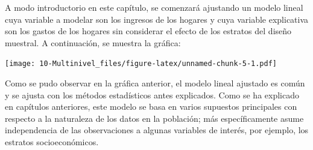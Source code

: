 \documentclass[
  12pt,
]{book}
\newenvironment{Shaded}{\begin{snugshade}}{\end{snugshade}}
\newcommand{\AttributeTok}[1]{\textcolor[rgb]{0.77,0.63,0.00}{#1}}
\newcommand{\FloatTok}[1]{\textcolor[rgb]{0.00,0.00,0.81}{#1}}
\newcommand{\FunctionTok}[1]{\textcolor[rgb]{0.00,0.00,0.00}{#1}}
\newcommand{\NormalTok}[1]{#1}
\newcommand{\SpecialCharTok}[1]{\textcolor[rgb]{0.00,0.00,0.00}{#1}}
\newcommand{\StringTok}[1]{\textcolor[rgb]{0.31,0.60,0.02}{#1}}
\begin{document}
A modo introductorio en este capítulo, se comenzará ajustando un modelo lineal cuya variable a modelar son los ingresos de los hogares y cuya variable explicativa son los gastos de los hogares sin considerar el efecto de los estratos del diseño muestral. A continuación, se muestra la gráfica:

\begin{Shaded}
\end{Shaded}

\texttt{[image: 10-Multinivel\_files/figure-latex/unnamed-chunk-5-1.pdf]}

Como se pudo observar en la gráfica anterior, el modelo lineal ajustado es común y se ajusta con los métodos estadísticos antes explicados. Como se ha explicado en capítulos anteriores, este modelo se basa en varios supuestos principales con respecto a la naturaleza de los datos en la población; más específicamente asume independencia de las observaciones a algunas variables de interés, por ejemplo, los estratos socioeconómicos.
\end{document}
